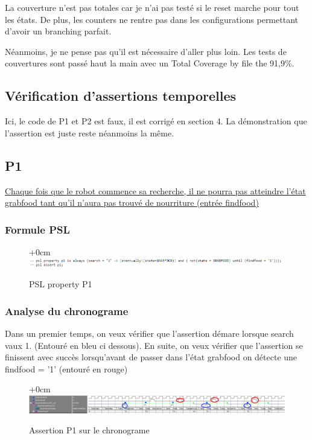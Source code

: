 \documentclass{article}
\newcommand{\sautligne}{
\textbf{\vspace{5mm}}
}
\begin{document}
La couverture n'est pas totales car je n'ai pas testé si le reset marche pour tout les états. De plus, les counters ne rentre pas dans les configurations permettant d'avoir un branching parfait. 
\sautligne 

Néanmoins, je ne pense pas qu'il est nécessaire d'aller plus loin. Les tests de couvertures sont passé haut la main avec un Total Coverage by file the 91,9\%.

\newpage
\begin{landscape}


\section{Vérification d'assertions temporelles}

Ici, le code de P1 et P2 est faux, il est corrigé en section 4. La démonstration que l'assertion est juste reste néanmoins la même.

\subsection{P1}
\uline{Chaque fois que le robot commence sa recherche, il ne pourra pas atteindre l'état 
grabfood tant qu'il n'aura pas trouvé de nourriture (entrée findfood)}

\subsubsection{Formule PSL }
\begin{figure}[!h]
\advance\leftskip+0cm
\includegraphics[scale=0.7]{PSL/P1.PNG}
\caption{PSL property P1}
\end{figure}

\subsubsection{Analyse du chronograme}
Dans un premier temps, on veux vérifier que l'assertion démare lorsque search vaux 1. (Entouré en bleu ci dessous). 
En suite, on veux vérifier que l'assertion se finissent avec succès lorsqu'avant de passer dans l'état grabfood on détecte une findfood = '1' (entouré en rouge)

\begin{figure}[!h]
\advance\leftskip+0cm
\includegraphics[scale=0.6]{PSL/P1-1.PNG}
\caption{Assertion P1 sur le chronograme }
\end{figure}


\end{landscape}
\end{document}
